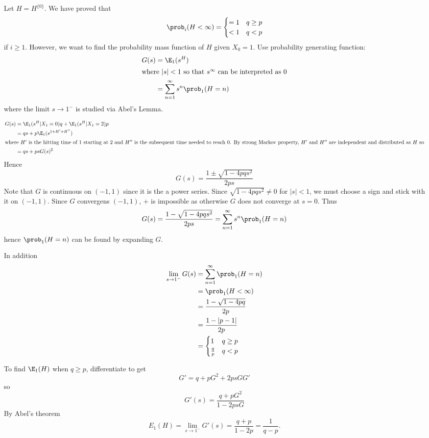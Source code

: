 \documentclass[a4paper]{article}
\begin{document}
\begin{eg}
  Let \(H = H^{\{0\}}\). We have proved that
  \[
    \prob_i(H < \infty) =
    \begin{cases}
      = 1 & q \geq p \\
      < 1 & q < p
    \end{cases}
  \]
  if \(i \geq 1\). However, we want to find the probability mass function of \(H\) given \(X_0 = 1\). Use probability generating function:
  \begin{align*}
    G(s) &= \E_1(s^H) \\
    \intertext{where \(|s| < 1\) so that \(s^\infty\) can be interpreted as \(0\)}
         &= \sum_{n = 1}^{\infty} s^n \prob_1(H = n) \\
  \end{align*}
  where the limit \(s \to 1^-\) is studied via Abel's Lemma.

  \begin{align*}
    G(s) &= \E_1(s^H | X_1 = 0)q + \E_1(s^H | X_1 = 2)p \\
         &= qs + p \E_1(s^{1 + H' + H''}) \\
           \intertext{where \(H'\) is the hitting time of \(1\) starting at \(2\) and \(H''\) is the subsequent time needed to reach \(0\). By strong Markov property, \(H'\) and \(H''\) are independent and distributed as \(H\) so}
         &= qs + ps G(s)^2
  \end{align*}
  Hence
  \[
    G(s) = \frac{1 \pm \sqrt{1 - 4pqs^2}}{2ps}
  \]
  Note that \(G\) is continuous on \((-1, 1)\) since it is the a power series. Since \(\sqrt{1 - 4pqs^2} \neq 0\) for \(|s| < 1\), we must choose a sign and stick with it on \((-1, 1)\). Since \(G\) convergens \((-1, 1)\), \(+\) is impossible as otherwise \(G\) does not converge at \(s = 0\). Thus
  \[
    G(s) = \frac{1 - \sqrt{1 - 4pqs^2}}{2ps} = \sum_{n = 1}^{\infty} s^n \prob_1(H = n)
  \]
  hence \(\prob_1(H = n) \) can be found by expanding \(G\).

  In addition
  \begin{align*}
    \lim_{s \to 1^-} G(s) &= \sum_{n = 1 }^{\infty} \prob_1(H = n) \\
                          &= \prob_1(H < \infty) \\
                          &= \frac{1 - \sqrt{1- 4pq}}{2p} \\
                          &= \frac{1 - |p - 1|}{2p} \\
                          &=
                            \begin{cases}
                              1 & q \geq p \\
                              \frac{q}{p} & q < p
                            \end{cases}
  \end{align*}

  To find \(\E_1(H)\) when \(q \geq p\), differentiate to get
  \[
    G' = q + p G^2 + 2ps G G'
  \]
  so
  \[
    G'(s) = \frac{q + pG^2}{1 - 2psG}
  \]
  By Abel's theorem
  \[
    E_1(H) = \lim_{s \to 1^-} G'(s) = \frac{q + p}{1 - 2p} = \frac{1}{q - p}.
  \]
\end{eg}
\iffalse
\appendix
\end{document}
